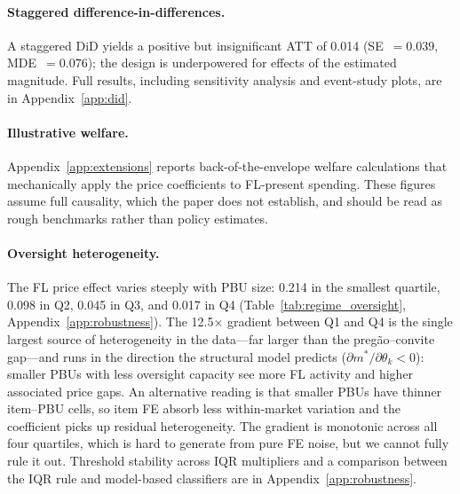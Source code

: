 \paragraph{Staggered difference-in-differences.}
A \citet{callaway2021difference} staggered DiD yields a positive but
insignificant ATT of 0.014 (SE~$= 0.039$, MDE~$= 0.076$); the design
is underpowered for effects of the estimated magnitude. Full results,
including \citet{rambachan2023more} sensitivity analysis and
event-study plots, are in Appendix~\ref{app:did}.


\paragraph{Illustrative welfare.}
Appendix~\ref{app:extensions} reports back-of-the-envelope welfare
calculations that mechanically apply the price coefficients to
FL-present spending. These figures assume full causality, which the
paper does not establish, and should be read as rough benchmarks
rather than policy estimates.


\paragraph{Oversight heterogeneity.}
The FL price effect varies steeply with PBU size: 0.214 in the
smallest quartile, 0.098 in Q2, 0.045 in Q3, and 0.017 in Q4
(Table~\ref{tab:regime_oversight}, Appendix~\ref{app:robustness}).
The 12.5$\times$ gradient between Q1 and Q4 is the single largest
source of heterogeneity in the data---far larger than the
preg\~ao--convite gap---and runs in the direction the structural
model predicts ($\partial m^*/\partial \theta_k < 0$): smaller PBUs
with less oversight capacity see more FL activity and higher
associated price gaps. An alternative reading is that smaller PBUs
have thinner item--PBU cells, so item FE absorb less within-market
variation and the coefficient picks up residual heterogeneity. The
gradient is monotonic across all four quartiles, which is hard to
generate from pure FE noise, but we cannot fully rule it out.
Threshold stability across IQR multipliers and a comparison between
the IQR rule and model-based classifiers are in
Appendix~\ref{app:robustness}.
